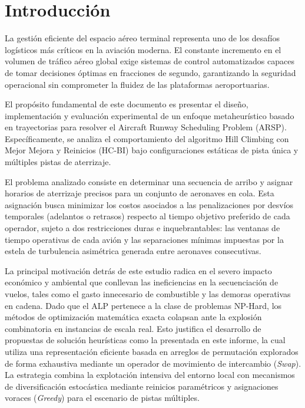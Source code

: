 \documentclass[letter, 10pt]{article}
\begin{document}
\section{Introducción}

La gestión eficiente del espacio aéreo terminal representa uno de los desafíos logísticos más críticos en la aviación moderna. El constante incremento en el volumen de tráfico aéreo global exige sistemas de control automatizados capaces de tomar decisiones óptimas en fracciones de segundo, garantizando la seguridad operacional sin comprometer la fluidez de las plataformas aeroportuarias. 

El propósito fundamental de este documento es presentar el diseño, implementación y evaluación experimental de un enfoque metaheurístico basado en trayectorias para resolver el Aircraft\textit{} Runway Scheduling Problem (ARSP). Específicamente, se analiza el comportamiento del algoritmo Hill Climbing con Mejor Mejora y Reinicios (HC-BI) bajo configuraciones estáticas de pista única y múltiples pistas de aterrizaje.

El problema analizado consiste en determinar una secuencia de arribo y asignar horarios de aterrizaje precisos para un conjunto de aeronaves en cola. Esta asignación busca minimizar los costos asociados a las penalizaciones por desvíos temporales (adelantos o retrasos) respecto al tiempo objetivo preferido de cada operador, sujeto a dos restricciones duras e inquebrantables: las ventanas de tiempo operativas de cada avión y las separaciones mínimas impuestas por la estela de turbulencia asimétrica generada entre aeronaves consecutivas. 

La principal motivación detrás de este estudio radica en el severo impacto económico y ambiental que conllevan las ineficiencias en la secuenciación de vuelos, tales como el gasto innecesario de combustible y las demoras operativas en cadena. Dado que el ALP pertenece a la clase de problemas NP-Hard, los métodos de optimización matemática exacta colapsan ante la explosión combinatoria en instancias de escala real. Esto justifica el desarrollo de propuestas de solución heurísticas como la presentada en este informe, la cual utiliza una representación eficiente basada en arreglos de permutación explorados de forma exhaustiva mediante un operador de movimiento de intercambio (\textit{Swap}). La estrategia combina la explotación intensiva del entorno local con mecanismos de diversificación estocástica mediante reinicios paramétricos y asignaciones voraces (\textit{Greedy}) para el escenario de pistas múltiples.
\end{document}
